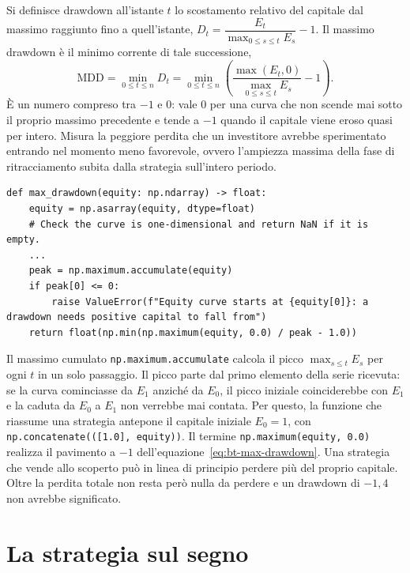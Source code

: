 Si definisce drawdown all'istante $t$ lo scostamento relativo del capitale dal massimo raggiunto fino a quell'istante, $D_t=\dfrac{E_t}{\max_{0\leq s\leq t}E_s}-1$. Il massimo drawdown è il minimo corrente di tale successione,
\begin{equation}
\label{eq:bt-max-drawdown}
\mathrm{MDD}=\min_{0\leq t\leq n}D_t=\min_{0\leq t\leq n}\left(\frac{\max(E_t,0)}{\max_{0\leq s\leq t}E_s}-1\right).
\end{equation}
È un numero compreso tra $-1$ e $0$: vale $0$ per una curva che non scende mai sotto il proprio massimo precedente e tende a $-1$ quando il capitale viene eroso quasi per intero. Misura la peggiore perdita che un investitore avrebbe sperimentato entrando nel momento meno favorevole, ovvero l'ampiezza massima della fase di ritracciamento subita dalla strategia sull'intero periodo.

\begin{listing}[H]
\begin{verbatim}
def max_drawdown(equity: np.ndarray) -> float:
    equity = np.asarray(equity, dtype=float)
    # Check the curve is one-dimensional and return NaN if it is empty.
    ...
    peak = np.maximum.accumulate(equity)
    if peak[0] <= 0:
        raise ValueError(f"Equity curve starts at {equity[0]}: a drawdown needs positive capital to fall from")
    return float(np.min(np.maximum(equity, 0.0) / peak - 1.0))
\end{verbatim}
\caption{\texttt{max\_drawdown}}
\label{lst:max-drawdown}
\end{listing}

Il massimo cumulato \texttt{np.maximum.accumulate} calcola il picco $\max_{s\leq t}E_s$ per ogni $t$ in un solo passaggio. Il picco parte dal primo elemento della serie ricevuta: se la curva cominciasse da $E_1$ anziché da $E_0$, il picco iniziale coinciderebbe con $E_1$ e la caduta da $E_0$ a $E_1$ non verrebbe mai contata. Per questo, la funzione che riassume una strategia antepone il capitale iniziale $E_0=1$, con \texttt{np.concatenate(([1.0], equity))}. Il termine \texttt{np.maximum(equity, 0.0)} realizza il pavimento a $-1$ dell'equazione~\eqref{eq:bt-max-drawdown}. Una strategia che vende allo scoperto può in linea di principio perdere più del proprio capitale. Oltre la perdita totale non resta però nulla da perdere e un drawdown di $-1{,}4$ non avrebbe significato.

\section{La strategia sul segno}
\label{sec:bt-strategy}

